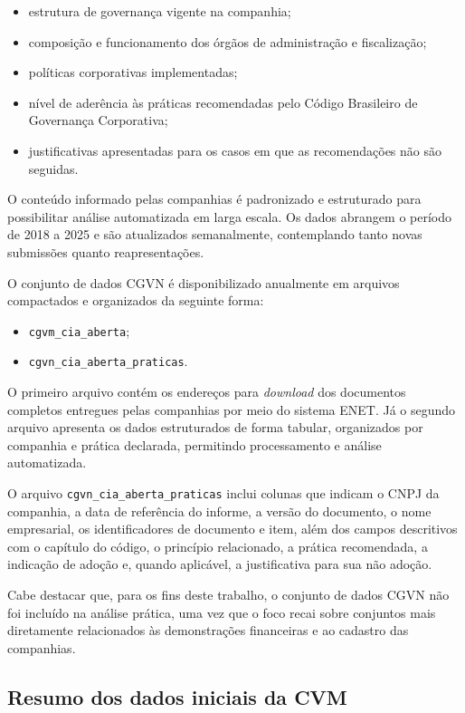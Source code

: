 \begin{itemize}
	\item estrutura de governança vigente na companhia;
	\item composição e funcionamento dos órgãos de administração e fiscalização;
	\item políticas corporativas implementadas;
	\item nível de aderência às práticas recomendadas pelo Código Brasileiro de Governança Corporativa;
	\item justificativas apresentadas para os casos em que as recomendações não são seguidas.
\end{itemize}

O conteúdo informado pelas companhias é padronizado e estruturado para possibilitar análise automatizada em larga escala. Os dados abrangem o período de 2018 a 2025 e são atualizados semanalmente, contemplando tanto novas submissões quanto reapresentações.

O conjunto de dados CGVN é disponibilizado anualmente em arquivos compactados e organizados da seguinte forma:

\begin{itemize}
	\item \texttt{cgvm\_cia\_aberta};
	\item \texttt{cgvn\_cia\_aberta\_praticas}.
\end{itemize}

O primeiro arquivo contém os endereços para \textit{download} dos documentos completos entregues pelas companhias por meio do sistema ENET. Já o segundo arquivo apresenta os dados estruturados de forma tabular, organizados por companhia e prática declarada, permitindo processamento e análise automatizada.

O arquivo \texttt{cgvn\_cia\_aberta\_praticas} inclui colunas que indicam o CNPJ da companhia, a data de referência do informe, a versão do documento, o nome empresarial, os identificadores de documento e item, além dos campos descritivos com o capítulo do código, o princípio relacionado, a prática recomendada, a indicação de adoção e, quando aplicável, a justificativa para sua não adoção.

Cabe destacar que, para os fins deste trabalho, o conjunto de dados CGVN não foi incluído na análise prática, uma vez que o foco recai sobre conjuntos mais diretamente relacionados às demonstrações financeiras e ao cadastro das companhias.


\subsection{Resumo dos dados iniciais da CVM}

